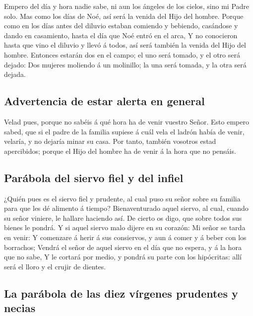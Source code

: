  Empero del día y hora nadie sabe, ni aun los ángeles de
los cielos, sino mi Padre solo.  Mas como los días de Noé,
así será la venida del Hijo del hombre.  Porque como en los
días antes del diluvio estaban comiendo y bebiendo, casándose y dando en
casamiento, hasta el día que Noé entró en el arca,  Y no
conocieron hasta que vino el diluvio y llevó á todos, así será también
la venida del Hijo del hombre.  Entonces estarán dos en el
campo; el uno será tomado, y el otro será dejado:  Dos
mujeres moliendo á un molinillo; la una será tomada, y la otra será
dejada.

\hypertarget{advertencia-de-estar-alerta-en-general}{%
\subsection{Advertencia de estar alerta en
general}\label{advertencia-de-estar-alerta-en-general}}

 Velad pues, porque no sabéis á qué hora ha de venir
vuestro Señor.  Esto empero sabed, que si el padre de la
familia supiese á cuál vela el ladrón había de venir, velaría, y no
dejaría minar su casa.  Por tanto, también vosotros estad
apercibidos; porque el Hijo del hombre ha de venir á la hora que no
pensáis.

\hypertarget{paruxe1bola-del-siervo-fiel-y-del-infiel}{%
\subsection{Parábola del siervo fiel y del
infiel}\label{paruxe1bola-del-siervo-fiel-y-del-infiel}}

 ¿Quién pues es el siervo fiel y prudente, al cual puso su
señor sobre su familia para que les dé alimento á tiempo? 
Bienaventurado aquel siervo, al cual, cuando su señor viniere, le
hallare haciendo así.  De cierto os digo, que sobre todos
sus bienes le pondrá.  Y si aquel siervo malo dijere en su
corazón: Mi señor se tarda en venir:  Y comenzare á herir á
sus consiervos, y aun á comer y á beber con los borrachos; 
Vendrá el señor de aquel siervo en el día que no espera, y á la hora que
no sabe,  Y le cortará por medio, y pondrá su parte con los
hipócritas: allí será el lloro y el crujir de dientes.

\hypertarget{la-paruxe1bola-de-las-diez-vuxedrgenes-prudentes-y-necias}{%
\subsection{La parábola de las diez vírgenes prudentes y
necias}\label{la-paruxe1bola-de-las-diez-vuxedrgenes-prudentes-y-necias}}

